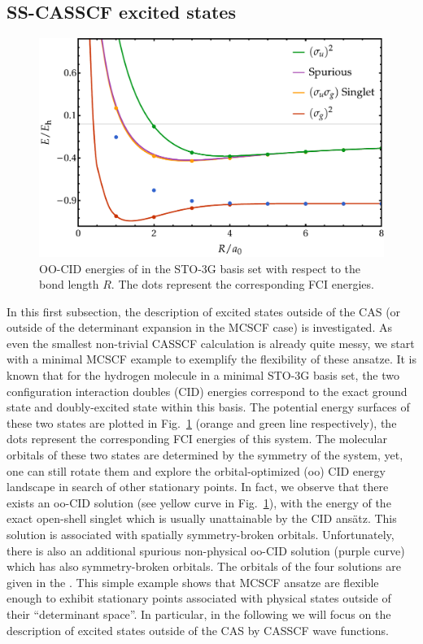 \documentclass[aps,prb,reprint,showkeys,superscriptaddress]{revtex4-1}
\begin{document}
\subsection{SS-CASSCF excited states}
\label{sec:excited}

\begin{figure}
  \centering
  \includegraphics[width=\linewidth]{Figures/fig_1.pdf}
  \caption{
    OO-CID energies of  in the STO-3G basis set with respect to the bond length $R$. The dots represent the corresponding FCI energies.
    \label{fig:fig_1}}
\end{figure}

In this first subsection, the description of excited states outside of the CAS (or outside of the determinant expansion in the MCSCF case) is investigated.
As even the smallest non-trivial CASSCF calculation is already quite messy, we start with a minimal MCSCF example to exemplify the flexibility of these ansatze.
It is known that for the hydrogen molecule in a minimal STO-3G basis set, \cite{Hehre_1969} the two configuration interaction doubles (CID) energies correspond to the exact ground state and doubly-excited state within this basis.
The potential energy surfaces of these two states are plotted in Fig.~\ref{fig:fig_1}  (orange and green line respectively), the dots represent the corresponding FCI energies of this system.
The molecular orbitals of these two states are determined by the symmetry of the system, yet, one can still rotate them and explore the orbital-optimized (oo) CID energy landscape in search of other stationary points.
In fact, we observe that there exists an oo-CID solution (see yellow curve in Fig.~\ref{fig:fig_1}), with the energy of the exact open-shell singlet which is usually unattainable by the CID ans\"atz.
This solution is associated with spatially symmetry-broken orbitals.
Unfortunately, there is also an additional spurious non-physical oo-CID solution (purple curve) which has also symmetry-broken orbitals.
The orbitals of the four solutions are given in the \SupInf.
This simple example shows that MCSCF ansatze are flexible enough to exhibit stationary points associated with physical states outside of their ``determinant space''.
In particular, in the following we will focus on the description of excited states outside of the CAS by CASSCF wave functions.
\end{document}
